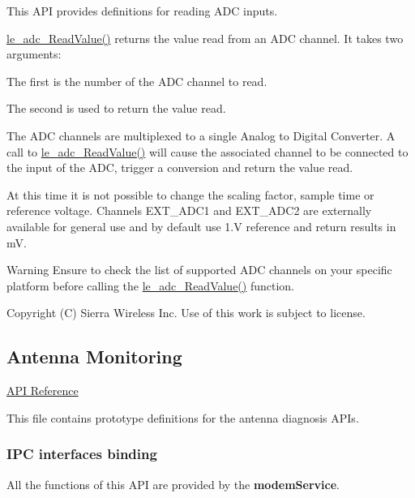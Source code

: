 This A\+P\+I provides definitions for reading A\+D\+C inputs.

\hyperlink{le__adc__interface_8h_a9ba93ebff4dbb6f387bfe9567f65ec46}{le\+\_\+adc\+\_\+\+Read\+Value()} returns the value read from an A\+D\+C channel. It takes two arguments\+:
\begin{DoxyItemize}
\item The first is the number of the A\+D\+C channel to read.
\item The second is used to return the value read.
\end{DoxyItemize}

The A\+D\+C channels are multiplexed to a single Analog to Digital Converter. A call to \hyperlink{le__adc__interface_8h_a9ba93ebff4dbb6f387bfe9567f65ec46}{le\+\_\+adc\+\_\+\+Read\+Value()} will cause the associated channel to be connected to the input of the A\+D\+C, trigger a conversion and return the value read.

At this time it is not possible to change the scaling factor, sample time or reference voltage. Channels E\+X\+T\+\_\+\+A\+D\+C1 and E\+X\+T\+\_\+\+A\+D\+C2 are externally available for general use and by default use 1.\+V reference and return results in m\+V.

\begin{DoxyWarning}{Warning}
Ensure to check the list of supported A\+D\+C channels on your specific platform before calling the \hyperlink{le__adc__interface_8h_a9ba93ebff4dbb6f387bfe9567f65ec46}{le\+\_\+adc\+\_\+\+Read\+Value()} function.
\end{DoxyWarning}




Copyright (C) Sierra Wireless Inc. Use of this work is subject to license. \hypertarget{c_antenna}{}\subsection{Antenna Monitoring}\label{c_antenna}
\hyperlink{le__antenna__interface_8h}{A\+P\+I Reference}





This file contains prototype definitions for the antenna diagnosis A\+P\+Is.\hypertarget{c_antenna_le_antenna_binding}{}\subsubsection{I\+P\+C interfaces binding}\label{c_antenna_le_antenna_binding}
All the functions of this A\+P\+I are provided by the {\bfseries modem\+Service}.

